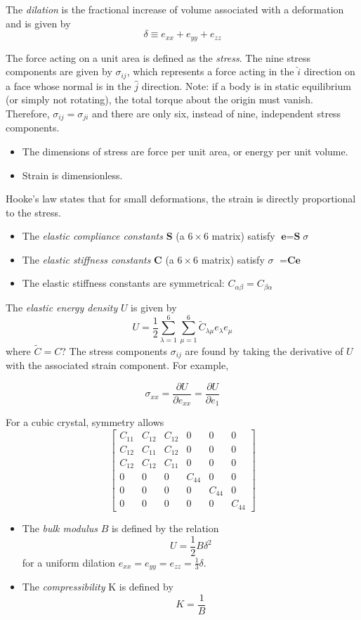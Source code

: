\documentclass[10pt]{article}
\begin{document}
The \emph{dilation} is the fractional increase of volume associated with a deformation and is given by
$$
\delta \equiv e_{xx} + e_{yy} + e_{zz}
$$

The force acting on a unit area is defined as the \emph{stress}. The nine stress components are given by
$\sigma_{ij}$, which represents a force acting in the $\hat{i}$ direction on a face whose normal is in the $\hat{j}$
direction. Note: if a body is in static equilibrium (or simply not rotating), the total torque about the origin must vanish.
Therefore, $\sigma_{ij} = \sigma_{ji}$ and there are only six, instead of nine, independent stress components.

\begin{itemize}
  \item The dimensions of stress are force per unit area, or energy per unit volume.
  \item Strain is dimensionless.
\end{itemize}

Hooke's law states that for small deformations, the strain is directly proportional to the stress.
\begin{itemize}
  \item The \emph{elastic compliance constants} \textbf{S} (a $6\times6$ matrix) satisfy
  $\textbf{e} = \textbf{S}$\textbf{$\sigma$}
  \item The \emph{elastic stiffness constants} \textbf{C}  (a $6\times6$ matrix) satisfy
  \textbf{$\sigma$} $ = \textbf{C}\textbf{e}$
  \item The elastic stiffness constants are symmetrical: $C_{\alpha\beta} = C_{\beta\alpha}$
\end{itemize}

The \emph{elastic energy density } $U$ is given by
$$
U = \frac{1}{2}\sum_{\lambda = 1}^{6}\sum_{\mu = 1}^{6}\tilde{C}_{\lambda\mu}e_{\lambda}e_{\mu}
$$
where $\tilde{C} = C$? The stress components $\sigma_{ij}$ are found by taking the derivative of $U$ with the
associated strain component. For example,

$$\sigma_{xx} = \frac{\partial U}{\partial e_{xx}} = \frac{\partial U}{\partial e_{1}}$$

For a cubic crystal, symmetry allows
$$
\begin{bmatrix}
C_{11} & C_{12}  & C_{12} & 0  & 0 & 0\\
C_{12} & C_{11} & C_{12} & 0 & 0 & 0\\
C_{12} & C_{12} & C_{11} & 0 &  0& 0\\
0 & 0 & 0 & C_{44} & 0 & 0\\
0 &  0&  0&  0&  C_{44}& 0\\
0 &0  &  0& 0 &0  & C_{44}
\end{bmatrix}
$$
\begin{itemize}
  \item The \emph{bulk modulus} $B$ is defined by the relation
  $$U = \frac{1}{2}B\delta^{2}$$
  for a uniform dilation $e_{xx} = e_{yy} = e_{zz} = \frac{1}{3}\delta$.
  \item The \emph{compressibility } K is defined by
  $$K = \frac{1}{B}$$
\end{itemize}
\end{document}

